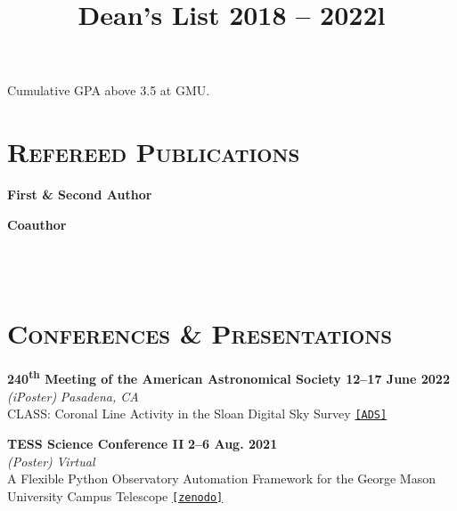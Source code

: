 \documentclass[marg, centered]{res}
\begin{document}
\begin{resume}
\vspace{-0.3cm}
\title{\textbf{Dean's List} \hfill \textbf{2018 -- 2022}}
\begin{position}
Cumulative GPA above 3.5 at GMU.
\end{position}

\newpage
\section{{\scshape \bfseries Refereed Publications}}

\vspace{-0.1cm}
\textbf{First \& Second Author}
\vspace{0.05cm}

\textbf{Coauthor}
\vspace{0.05cm}
\vspace{0.05cm}


\begin{format}
\title{l} \\
 \\
\body
\end{format}

\section{{\scshape \bfseries Conferences \& Presentations}}

\begin{etaremune}
    
\item \textbf{240\textsuperscript{th} Meeting of the American Astronomical Society \hfill \textbf{12--17 June 2022}}\\
\textit{(iPoster)} \hfill \textit{Pasadena, CA}\\
CLASS: Coronal Line Activity in the Sloan Digital Sky Survey \href{https://ui.adsabs.harvard.edu/abs/2022AAS...24010113R/abstract}{\texttt{[ADS]}}

\item \textbf{TESS Science Conference II} \hfill \textbf{2--6 Aug. 2021}\\
\textit{(Poster)} \hfill \textit{Virtual}\\
A Flexible Python Observatory Automation Framework for the George Mason\\ University Campus Telescope \href{https://zenodo.org/record/5115310}{\texttt{[zenodo]}}


\end{etaremune}
\end{resume}
\end{document}
